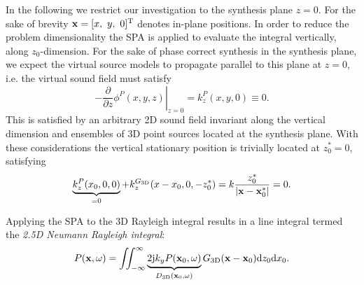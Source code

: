 In the following we restrict our investigation to the synthesis plane $z=0$.
For the sake of brevity $\vx = [x,\ y,\ 0]^{\mathrm{T}}$ denotes in-plane positions.
In order to reduce the problem dimensionality the SPA is applied to evaluate the integral vertically, along $z_0$-dimension.
For the sake of phase correct synthesis in the synthesis plane, we expect the virtual source models to propagate parallel to this plane at $z=0$, i.e. the virtual sound field must satisfy
\begin{equation}
-\left. \frac{\partial}{\partial z} \phi^P(x,y,z)\right|_{z = 0} = k_z^P(x,y,0) \equiv 0.
\end{equation}
This is satisfied by an arbitrary 2D sound field invariant along the vertical dimension and ensembles of 3D point sources located at the synthesis plane.
With these considerations the vertical stationary position is trivially located at $z_0^* = 0$, satisfying
\begin{equation}
\underbrace{k_z^P(x_0,0,0)}_{ = 0} + k_z^{G_{3\mathrm{D}}}(x - x_0,0,-z_0^*) = k \frac{z_0^*}{|\mathbf{x}-\mathbf{x}_0^*|} =0.
\end{equation}

Applying the SPA to the 3D Rayleigh integral results in a line integral termed the \emph{2.5D Neumann Rayleigh integral}:
\begin{equation}
P(\mathbf{x},\omega) = \iint_{-\infty}^{\infty} 
\underbrace{ 2 \mathrm{j} k_y P(\mathbf{x}_0,\omega)}_{ D_{3\mathrm{D}}(\mathbf{x}_0, \omega) }
G_{3\mathrm{D}}(\mathbf{x}-\mathbf{x}_0) \mathrm{d} z_0 \mathrm{d} x_0.
\label{eq:25D_WFS:25D_neumann} 
\end{equation}


%



